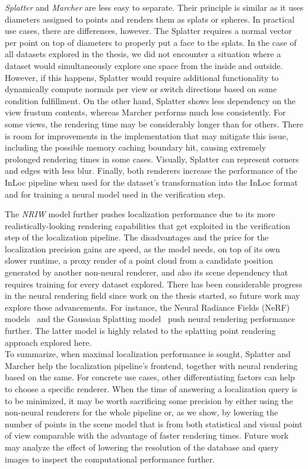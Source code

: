 \emph{Splatter} and \emph{Marcher} are less easy to separate. Their principle
is similar as it uses diameters assigned to points and renders them as splats or
spheres. In practical use cases, there are differences, however.
The Splatter requires a normal vector per point on top of diameters to
properly put a face to the splats. In the case of all datasets explored in the
thesis, we did not encounter a situation where a dataset would simultaneously
explore one space from the inside and outside. However, if this happens, Splatter
would require additional functionality to dynamically compute normals per view
or switch directions based on some condition fulfillment. On the other hand,
Splatter shows less dependency on the view frustum contents, whereas Marcher
performs much less consistently. For some views, the rendering time may be
considerably longer than for others. There is room for improvements in the
implementation that may mitigate this issue, including the possible memory caching
boundary hit, causing extremely prolonged rendering times in some cases. Visually,
Splatter can represent corners and edges with less blur. Finally, both
renderers increase the performance of the InLoc pipeline when used for the
dataset's transformation into the InLoc format and for training a neural model
used in the verification step.

The \emph{NRIW} model further pushes localization performance due to its more
realistically-looking rendering capabilities that get exploited in the verification
step of the localization pipeline. The disadvantages and the price for the localization
precision gains are speed, as the model needs, on top of its own slower runtime,
a proxy render of a point cloud from a candidate position generated by another
non-neural renderer, and also its scene dependency that requires training for
every dataset explored. There has been considerable progress in the neural rendering
field since work on the thesis started, so future work may explore these advancements.
For instance, the Neural Radiance Fields (NeRF) models~\citep{NERF, NERF2} and the
Gaussian Splatting model~\citep{kerbl3Dgaussians} push neural rendering performance
further. The latter model is highly related to the splatting point rendering approach
explored here.\\

To summarize, when maximal localization performance is sought, Splatter and Marcher
help the localization pipeline's frontend, together with neural rendering based on the
same. For concrete use cases, other differentiating factors can help to choose a specific
renderer. When the time of answering a localization query is to be minimized, it may be
worth sacrificing some precision by either using the non-neural renderers for the whole
pipeline or, as we show, by lowering the number of points in the scene model that is from
both statistical and visual point of view comparable with the advantage of faster
rendering times. Future work may analyze the effect of lowering the resolution of the
database and query images to inspect the computational performance further.


